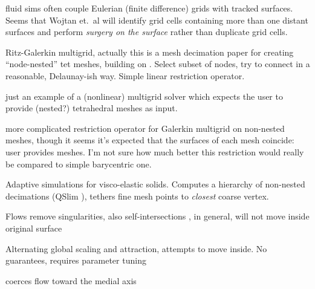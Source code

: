 \cite{wojtan2011liquid} fluid sims often couple Eulerian (finite difference)
grids with tracked surfaces. Seems that Wojtan et.\ al will identify grid cells
containing more than one distant surfaces and perform \emph{surgery on the
surface} rather than duplicate grid cells.

\cite{Adams:1999:PMS} Ritz-Galerkin multigrid, actually this is a mesh
decimation paper for creating ``node-nested'' tet meshes, building on
\cite{guillard1993}. Select subset of nodes, try to connect in a reasonable,
Delaunay-ish way. Simple linear restriction operator.

\cite{fish1995efficient} just an example of a (nonlinear) multigrid solver
which expects the user to provide (nested?) tetrahedral meshes as input.

\cite{feng1997non} more complicated restriction operator for Galerkin multigrid
on non-nested meshes, though it seems it's expected that the surfaces of each
mesh coincide: user provides meshes. I'm not sure how much better this
restriction would really be compared to simple barycentric one.

\cite{Debunne:2001:DRD} 
Adaptive simulations for visco-elastic solids. Computes a hierarchy of
non-nested decimations (QSlim \cite{Garland:1997:SSU}), tethers fine mesh
points to \emph{closest} coarse vertex.

Flows
\cite{Kazhdan2012} remove singularities, also self-intersections
\cite{Sacht:SIV:2013}, in general, will not move inside original surface

Alternating global scaling and attraction, attempts to move inside. No
guarantees, requires parameter tuning \cite{Wang:2008}

\cite{Tagliasacchi:2012:MCS} coerces flow toward the medial axis
